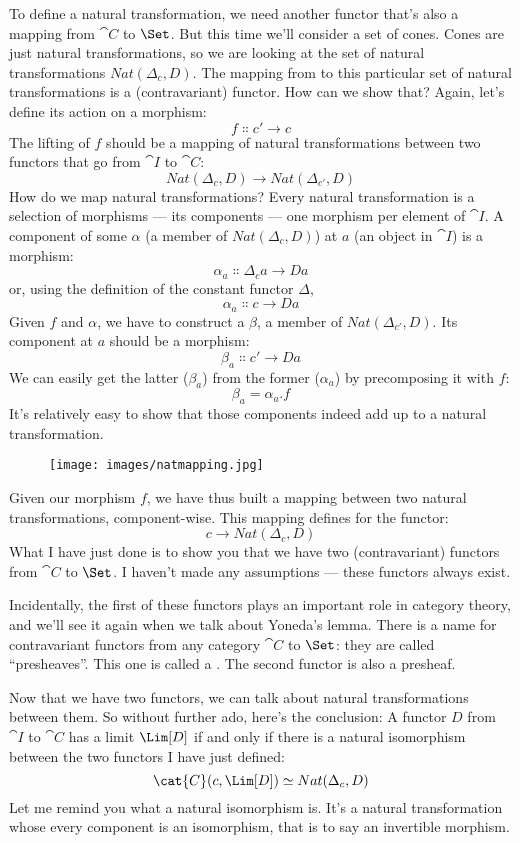 \noindent
To define a natural transformation, we need another functor that's also
a mapping from $\cat{C}$ to $\Set$. But this time we'll consider a
set of cones. Cones are just natural transformations, so we are looking
at the set of natural transformations $Nat(\Delta_c, D)$. The mapping
from  to this particular set of natural transformations is a
(contravariant) functor. How can we show that? Again, let's define its
action on a morphism:
\[f \Colon c\prime \to c\]
The lifting of $f$ should be a mapping of natural transformations
between two functors that go from $\cat{I}$ to $\cat{C}$:
\[Nat(\Delta_c, D) \to Nat(\Delta_{c\prime}, D)\]
How do we map natural transformations? Every natural transformation is a
selection of morphisms --- its components --- one morphism per element
of $\cat{I}$. A component of some $\alpha$ (a member of $Nat(\Delta_c, D)$) at
$a$ (an object in $\cat{I}$) is a morphism:
\[\alpha_a \Colon \Delta_c a \to D a\]
or, using the definition of the constant functor $\Delta$,
\[\alpha_a \Colon c \to D a\]
Given $f$ and $\alpha$, we have to construct a $\beta$, a member of
$Nat(\Delta_{c\prime}, D)$. Its component at $a$ should be a
morphism:
\[\beta_a \Colon c\prime \to D a\]
We can easily get the latter ($\beta_a$) from the former ($\alpha_a$) by precomposing it with
$f$:
\[\beta_a = \alpha_a . f\]
It's relatively easy to show that those components indeed add up to a
natural transformation.

\begin{figure}[H]
\centering
\texttt{[image: images/natmapping.jpg]}
\end{figure}

\noindent
Given our morphism $f$, we have thus built a mapping between two
natural transformations, component-wise. This mapping defines
 for the functor:
\[c \to Nat(\Delta_c, D)\]
What I have just done is to show you that we have two (contravariant)
functors from $\cat{C}$ to $\Set$. I haven't made any assumptions
--- these functors always exist.

Incidentally, the first of these functors plays an important role in
category theory, and we'll see it again when we talk about Yoneda's
lemma. There is a name for contravariant functors from any category
$\cat{C}$ to $\Set$: they are called ``presheaves''. This one is
called a . The second functor is also a
presheaf.

Now that we have two functors, we can talk about natural transformations
between them. So without further ado, here's the conclusion: A functor
$D$ from $\cat{I}$ to $\cat{C}$ has a limit $\Lim[D]$ if and
only if there is a natural isomorphism between the two functors I have
just defined:
\[\cat{C}(c, \Lim[D]) \simeq Nat(\Delta_c, D)\]
Let me remind you what a natural isomorphism is. It's a natural
transformation whose every component is an isomorphism, that is to say
an invertible morphism.

